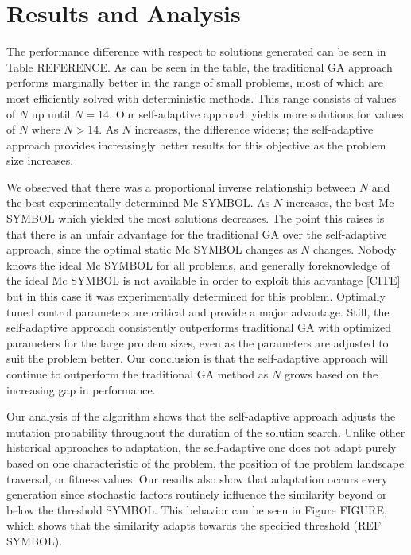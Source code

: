 \documentclass[conference]{IEEEtran}
\begin{document}
\section{Results and Analysis}
The performance difference with respect to solutions generated can be seen in Table {REFERENCE}. As can be seen in the table, the traditional GA approach performs marginally better in the range of small problems, most of which are most efficiently solved with deterministic methods. This range consists of values of $N$ up until $N = 14$. Our self-adaptive approach yields more solutions for values of $N$ where $N > 14$. As $N$ increases, the difference widens; the self-adaptive approach provides increasingly better results for this objective as the problem size increases.

We observed that there was a proportional inverse relationship between $N$ and the best experimentally determined {Mc SYMBOL}. As $N$ increases, the best {Mc SYMBOL} which yielded the most solutions decreases. The point this raises is that there is an unfair advantage for the traditional GA over the self-adaptive approach, since the optimal static {Mc SYMBOL} changes as $N$ changes. Nobody knows the ideal {Mc SYMBOL} for all problems, and generally foreknowledge of the ideal {Mc SYMBOL} is not available in order to exploit this advantage [CITE] but in this case it was experimentally determined for this problem. Optimally tuned control parameters are critical and provide a major advantage. Still, the self-adaptive approach consistently outperforms traditional GA with optimized parameters for the large problem sizes, even as the parameters are adjusted to suit the problem better. Our conclusion is that the self-adaptive approach will continue to outperform the traditional GA method as $N$ grows based on the increasing gap in performance.

Our analysis of the algorithm shows that the self-adaptive approach adjusts the mutation probability throughout the duration of the solution search. Unlike other historical approaches to adaptation, the self-adaptive one does not adapt purely based on one characteristic of the problem, the position of the problem landscape traversal, or fitness values. Our results also show that adaptation occurs every generation since stochastic factors routinely influence the similarity beyond or below the threshold {SYMBOL}. This behavior can be seen in Figure {FIGURE}, which shows that the similarity adapts towards the specified threshold {(REF SYMBOL)}.

\end{document}
